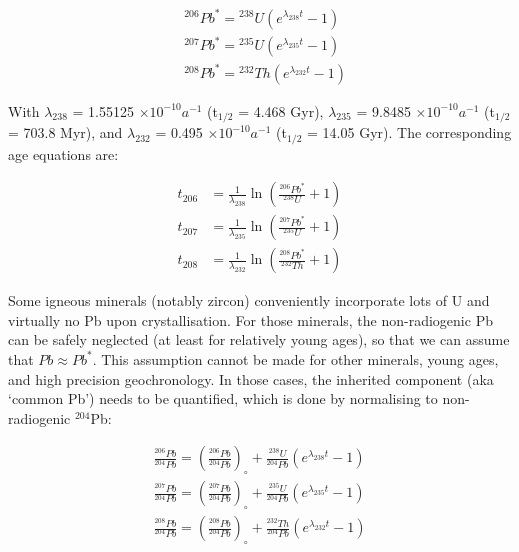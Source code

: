 \documentclass{book}
\begin{document}
\begin{equation}
  \begin{array}{rl}
    &{}^{206}Pb^* = {}^{238}U \left(e^{\lambda_{238}t} - 1\right)\\ 
    &{}^{207}Pb^* = {}^{235}U \left(e^{\lambda_{235}t} - 1\right)\\ 
    &{}^{208}Pb^* = {}^{232}Th \left(e^{\lambda_{232}t} - 1\right)
  \end{array}
  \label{eq:Pb*}
\end{equation}

With $\lambda_{238}$ = 1.55125 $\times 10^{-10} a^{-1}$ (t$_{1/2}$ =
4.468 Gyr), $\lambda_{235}$ = 9.8485 $\times 10^{-10} a^{-1}$
(t$_{1/2}$ = 703.8 Myr), and $\lambda_{232}$ = 0.495 $\times 10^{-10}
a^{-1}$ (t$_{1/2}$ = 14.05 Gyr). The corresponding age equations are:

\begin{equation}
  \begin{array}{rl}
    t_{206} & = \frac{1}{\lambda_{238}}
    \ln \left(\frac{{}^{206}Pb^*}{{}^{238}U}+1\right)\\
    t_{207} & = \frac{1}{\lambda_{235}}
    \ln \left(\frac{{}^{207}Pb^*}{{}^{235}U}+1\right)\\
    t_{208} & = \frac{1}{\lambda_{232}}
    \ln \left(\frac{{}^{208}Pb^*}{{}^{232}Th}+1\right)
  \end{array}
  \label{eq:tPb*}
\end{equation}

Some igneous minerals (notably zircon) conveniently incorporate lots
of U and virtually no Pb upon crystallisation. For those minerals, the
non-radiogenic Pb can be safely neglected (at least for relatively
young ages), so that we can assume that $Pb \approx Pb^*$. This
assumption cannot be made for other minerals, young ages, and high
precision geochronology. In those cases, the inherited component (aka
`common Pb') needs to be quantified, which is done by normalising to
non-radiogenic $^{204}$Pb:

\begin{equation}
\begin{array}{c}
  \frac{^{206}Pb}{^{204}Pb} = \left(\frac{^{206}Pb}{^{204}Pb}\right)_\circ +
  \frac{^{238}U}{^{204}Pb} \left(e^{\lambda_{238}t} - 1\right) \\
  \frac{^{207}Pb}{^{204}Pb} = \left(\frac{^{207}Pb}{^{204}Pb}\right)_\circ +
  \frac{^{235}U}{^{204}Pb} \left(e^{\lambda_{235}t} - 1\right)\\
  \frac{^{208}Pb}{^{204}Pb} = \left(\frac{^{208}Pb}{^{204}Pb}\right)_\circ +
  \frac{^{232}Th}{^{204}Pb} \left(e^{\lambda_{232}t} - 1\right)
\end{array}
\label{eq:Pb}
\end{equation}
\end{document}
